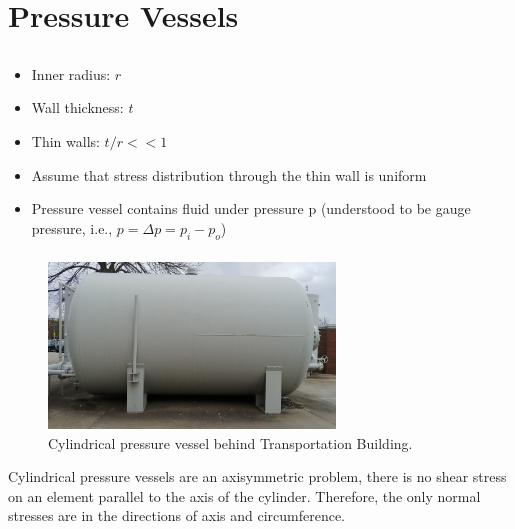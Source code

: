 \section{Pressure Vessels}

\subsection{}
\begin{itemize}
    \item Inner radius: $r$
    \item Wall thickness: $t$
    \item Thin walls: $t/r << 1$
    \item Assume that stress distribution through the thin wall is uniform
    \item Pressure vessel contains fluid under pressure p (understood to be gauge pressure, i.e., $p = \Delta p = p_i - p_o$)
\end{itemize}

\subsubsection{}

\begin{figure}[!h]
\centering
\includegraphics[angle=0, width=3in]{Pressure Vessels-Figures/cylindrical_vessel_example.jpg}
\vspace{-2mm}
\caption{\small Cylindrical pressure vessel behind Transportation Building.}
\vspace{-3mm}
\label{Fig:CylindricalVesselEx}
\end{figure}

\noindent Cylindrical pressure vessels are an axisymmetric problem, there is no shear stress on an element parallel to the axis of the cylinder. Therefore, the only normal stresses are in the directions of axis and circumference.

